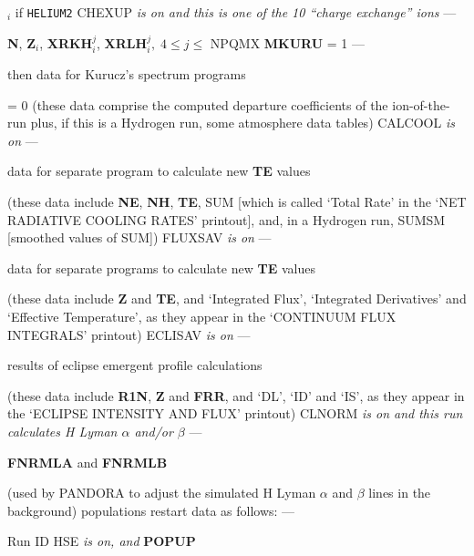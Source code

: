 $_i$ if {\tt HELIUM2}
\spice
{} CHEXUP {\it is on and this is one of the 10
``charge exchange'' ions} --- \par \noindent
{\bf N}, {\bf Z}$_i$, {\bf XRKH}$^j_i$, {\bf XRLH}$^j_i,
\; 4 \leq j \leq $ NPQMX
\spice
{} {\bf MKURU} = 1 --- \par \noindent
then data for Kurucz's spectrum programs \par
\spice
\vbox{\parindent=0pt \hangindent=10pt \hangafter = 0
(these data comprise the computed departure coefficients of the
ion-of-the-run plus, if this is a Hydrogen run, some atmosphere
data tables)}
\spice
{} CALCOOL {\it is on} --- \par \noindent
data for separate program to calculate new {\bf TE} values \par
\spice
\vbox{\parindent=0pt \hangindent=10pt 
(these data include {\bf NE}, {\bf NH}, {\bf TE}, SUM [which
is called `Total Rate' in the `NET RADIATIVE COOLING RATES' printout],
and, in a Hydrogen run, SUMSM [\ie smoothed values of SUM])}
\spice
{} FLUXSAV {\it is on} --- \par \noindent
data for separate programs to calculate new {\bf TE} values \par
\spice
\vbox{\parindent=0pt \hangindent=10pt 
(these data include {\bf Z} and {\bf TE}, and `Integrated Flux', 
`Integrated Derivatives' and `Effective Temperature', as they appear
in the `CONTINUUM FLUX INTEGRALS' printout)}
\spice
{} ECLISAV {\it is on} --- \par \noindent
results of eclipse emergent profile calculations \par
\spice
\vbox{\parindent=0pt \hangindent=10pt 
(these data include {\bf R1N}, {\bf Z} and {\bf FRR}, and `DL', `ID'
and `IS', as they appear in the `ECLIPSE INTENSITY AND FLUX' printout)}
\spice
{} CLNORM {\it is on and this run calculates H
Lyman $\alpha$ and/or $\beta$} --- \par \noindent
{\bf FNRMLA} and {\bf FNRMLB} \par
\spice
\vbox{\parindent=0pt \hangindent=10pt 
(used by PANDORA to adjust the simulated H Lyman $\alpha$
and $\beta$ lines in the background)}
\ej
{} populations restart data
as follows:
\blankline
{} --- \par \noindent
Run ID
\spice
{} HSE {\it is on, and } {\bf POPUP}
